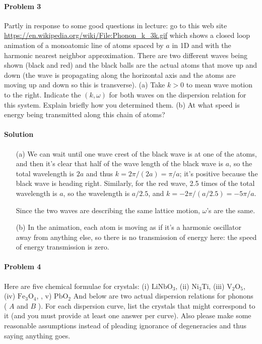 \documentclass[hyperref, a4paper]{article}
\newcommand{\address}[1]{\href{#1}{\url{#1}}}
\begin{document}
\paragraph{Problem 3} Partly in response to some good questions in lecture: go to this web site \address{https://en.wikipedia.org/wiki/File:Phonon\_k\_3k.gif} which shows a closed loop animation of a monoatomic line of atoms spaced by $a$ in 1D and with the harmonic nearest neighbor approximation. There are two different waves being shown (black and red) and the black balls are the actual atoms that move up and down (the wave is propagating along the horizontal axis and the atoms are moving up and down so this is transverse).
(a) Take $k>0$ to mean wave motion to the right. Indicate the $(k, \omega)$ for both waves on the dispersion relation for this system. Explain briefly how you determined them.
(b) At what speed is energy being transmitted along this chain of atoms?

\paragraph{Solution}

\begin{itemize}
\item[(a)] We can wait until one wave crest of the black wave is at one of the atoms,
and then it's clear that half of the wave length of the black wave is $a$,
so the total wavelength is $2a$ and thus $k = 2\pi / (2a) = \pi / a$;
it's positive because the black wave is heading right.
Similarly, for the red wave, 
2.5 times of the total wavelength is $a$, so the wavelength is $a / 2.5$,
and $k = - 2\pi / (a / 2.5) = - 5 \pi / a$.

Since the two waves are describing the same lattice motion,
$\omega$'s are the same.

\item[(b)] In the animation, 
each atom is moving as if it's a harmonic oscillator away from anything else,
so there is no transmission of energy here:
the speed of energy transmission is zero.
\end{itemize}

\paragraph{Problem 4} Here are five chemical formulae for crystals:
(i) $\mathrm{LiNbO}_3$, (ii) $\mathrm{Ni}_3 \mathrm{Ti}$, (iii) $\mathrm{V}_2 \mathrm{O}_5$, (iv) $\mathrm{Fe}_3 \mathrm{O}_4$, , v) $\mathrm{PbO}_2$
And below are two actual dispersion relations for phonons ( $A$ and $B$ ).
For each dispersion curve, list the crystals that might correspond to it (and you must provide at least one answer per curve). Also please make some reasonable assumptions instead of pleading ignorance of degeneracies and thus saying anything goes.
\end{document}
